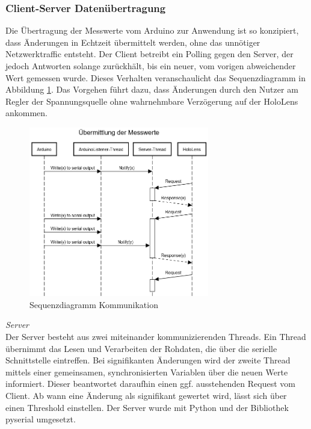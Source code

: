 \subsubsection{Client-Server Datenübertragung}
\label{sec-5-1-1}
Die Übertragung der Messwerte vom Arduino zur Anwendung ist so konzipiert, dass Änderungen in Echtzeit übermittelt werden, ohne das unnötiger Netzwerktraffic entsteht. Der Client betreibt ein Polling gegen den Server, der jedoch Antworten solange zurückhält, bis ein neuer, vom vorigen abweichender Wert gemessen wurde. Dieses Verhalten veranschaulicht das Sequenzdiagramm in Abbildung \ref{img:Sequenzdiagramm}. Das Vorgehen führt dazu, dass Änderungen durch den Nutzer am Regler der Spannungsquelle ohne wahrnehmbare Verzögerung auf der HoloLens ankommen.

\begin{figure}[H]
	\centering
	\includegraphics[width=0.7\textwidth]{images/schema/Sequenzdiagramm.png}
	\caption{Sequenzdiagramm Kommunikation}
	\label{img:Sequenzdiagramm}
\end{figure}

\textit{Server}\\
Der Server besteht aus zwei miteinander kommunizierenden Threads. Ein Thread übernimmt das Lesen und Verarbeiten der Rohdaten, die über die serielle Schnittstelle eintreffen. Bei signifikanten Änderungen wird der zweite Thread mittels einer gemeinsamen, synchronisierten Variablen über die neuen Werte informiert. Dieser beantwortet daraufhin einen ggf. ausstehenden Request vom Client. Ab wann eine Änderung als signifikant gewertet wird, lässt sich über einen Threshold einstellen. Der Server wurde mit Python und der Bibliothek pyserial umgesetzt.\\

